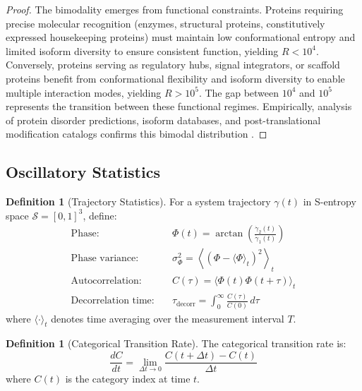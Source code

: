 \documentclass[11pt,twocolumn,a4paper]{article}
\theoremstyle{definition}
\newtheorem{definition}[theorem]{Definition}
\theoremstyle{remark}
\newcommand{\Sspace}{\mathcal{S}}
\newcommand{\taudecorr}{\tau_{\mathrm{decorr}}}
\begin{document}
\begin{proof}
The bimodality emerges from functional constraints. Proteins requiring precise molecular recognition (enzymes, structural proteins, constitutively expressed housekeeping proteins) must maintain low conformational entropy and limited isoform diversity to ensure consistent function, yielding $R < 10^4$. Conversely, proteins serving as regulatory hubs, signal integrators, or scaffold proteins benefit from conformational flexibility and isoform diversity to enable multiple interaction modes, yielding $R > 10^5$. The gap between $10^4$ and $10^5$ represents the transition between these functional regimes.
Empirically, analysis of protein disorder predictions, isoform databases, and post-translational modification catalogs confirms this bimodal distribution \citep{ellis2001macromolecular,vousden2009blinded}.
\end{proof}

\subsection{Oscillatory Statistics}

\begin{definition}[Trajectory Statistics]
\label{def:trajectory_statistics}
For a system trajectory $\gamma(t)$ in S-entropy space $\Sspace = [0,1]^3$, define:
\begin{align}
\text{Phase:} \quad &\Phi(t) = \arctan\left(\frac{\dot{\gamma}_2(t)}{\dot{\gamma}_1(t)}\right) \label{eq:phase} \\
\text{Phase variance:} \quad &\sigma_\Phi^2 = \left\langle \left(\Phi - \langle\Phi\rangle_t\right)^2 \right\rangle_t \label{eq:phase_variance} \\
\text{Autocorrelation:} \quad &C(\tau) = \langle \Phi(t) \Phi(t+\tau) \rangle_t \label{eq:autocorrelation} \\
\text{Decorrelation time:} \quad &\taudecorr = \int_0^\infty \frac{C(\tau)}{C(0)} \, d\tau \label{eq:decorrelation_time}
\end{align}
where $\langle \cdot \rangle_t$ denotes time averaging over the measurement interval $T$.
\end{definition}

\begin{definition}[Categorical Transition Rate]
\label{def:categorical_transition_rate}
The categorical transition rate is:
\begin{equation}
\frac{dC}{dt} = \lim_{\Delta t \to 0} \frac{C(t+\Delta t) - C(t)}{\Delta t}
\label{eq:categorical_transition_rate}
\end{equation}
where $C(t)$ is the category index at time $t$.
\end{definition}
\end{document}

